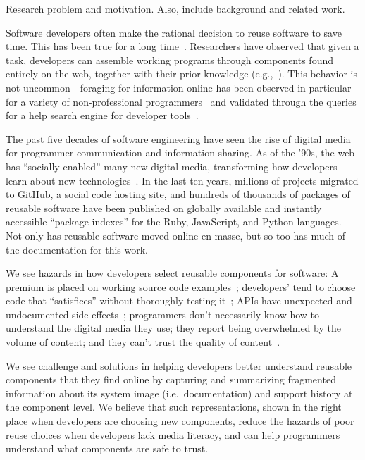 Research problem and motivation.
Also, include background and related work.

Software developers often make the rational decision to reuse software to save time.
This has been true for a long time~\cite{mili_reusing_1995}.
Researchers have observed that given a task, developers can assemble working programs through components found entirely on the web, together with their prior knowledge (e.g.,~\cite{brandt_two_2009}).
This behavior is not uncommon---foraging for information online has been observed in particular for a variety of non-professional programmers~\cite{brandt_opportunistic_2008} and validated through the queries for a help search engine for developer tools~\cite{brandt_two_2009}.

The past five decades of software engineering have seen the rise of digital media for programmer communication and information sharing.
As of the '90s, the web has ``socially enabled'' many new digital media, transforming how developers learn about new technologies~\cite{storey_revolution_2014}.
In the last ten years, millions of projects migrated to GitHub, a social code hosting site, and hundreds of thousands of packages of reusable software have been published on globally available and instantly accessible ``package indexes'' for the Ruby, JavaScript, and Python languages.
Not only has reusable software moved online en masse, but so too has much of the documentation for this work.

We see hazards in how developers select reusable components for software:
A premium is placed on working source code examples~\cite{nykaza_what_2002};
developers' tend to choose code that ``satisfices'' without thoroughly testing it~\cite{brandt_two_2009};
APIs have unexpected and undocumented side effects~\cite{robillard_field_2011};
programmers don't necessarily know how to understand the digital media they use;
they report being overwhelmed by the volume of content; and they can't trust the quality of content~\cite{storey_revolution_2014}.

We see challenge and solutions in helping developers better understand reusable components that they find online by capturing and summarizing fragmented information about its system image (i.e.\ documentation) and support history at the component level.
We believe that such representations, shown in the right place when developers are choosing new components, reduce the hazards of poor reuse choices when developers lack media literacy, and can help programmers understand what components are safe to trust.

